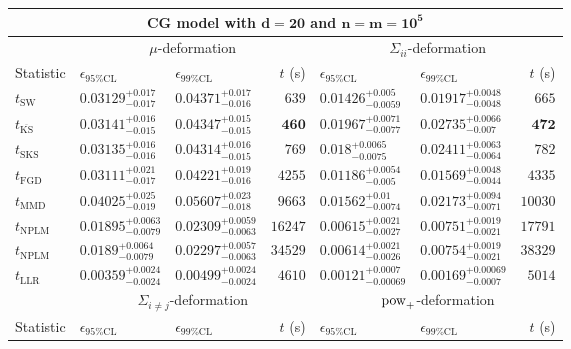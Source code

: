 \begin{tabular}{l|llr|llr}
	\toprule
	\multicolumn{7}{c}{{\bf CG model with $\mathbf{d=20}$ and $\mathbf{n=m=10^{5}}$}} \\
	\toprule
	\multicolumn{1}{c}{} & \multicolumn{3}{c}{$\mu$-deformation} & \multicolumn{3}{c}{$\Sigma_{ii}$-deformation} \\
	Statistic & $\epsilon_{95\%\mathrm{CL}}$ & $\epsilon_{99\%\mathrm{CL}}$ & $t$ (s) & $\epsilon_{95\%\mathrm{CL}}$ & $\epsilon_{99\%\mathrm{CL}}$ & $t$ (s) \\
	\midrule
	$t_{\mathrm{SW}}$ & $0.03129_{-0.017}^{+0.017}$ & $0.04371_{-0.016}^{+0.017}$ & $639$ & $0.01426_{-0.0059}^{+0.005}$ & $0.01917_{-0.0048}^{+0.0048}$ & $665$ \\
	$t_{\overline{\mathrm{KS}}}$ & $0.03141_{-0.015}^{+0.016}$ & $0.04347_{-0.015}^{+0.015}$ & ${\mathbf{460}}$ & $0.01967_{-0.0077}^{+0.0071}$ & $0.02735_{-0.007}^{+0.0066}$ & ${\mathbf{472}}$ \\
	$t_{\mathrm{SKS}}$ & $0.03135_{-0.016}^{+0.016}$ & $0.04314_{-0.015}^{+0.016}$ & $769$ & $0.018_{-0.0075}^{+0.0065}$ & $0.02411_{-0.0064}^{+0.0063}$ & $782$ \\
	$t_{\mathrm{FGD}}$ & ${\mathbf{0.03111_{-0.017}^{+0.021}}}$ & ${\mathbf{0.04221_{-0.016}^{+0.019}}}$ & $4255$ & ${\mathbf{0.01186_{-0.005}^{+0.0054}}}$ & ${\mathbf{0.01569_{-0.0044}^{+0.0048}}}$ & $4335$ \\
	$t_{\mathrm{MMD}}$ & $0.04025_{-0.019}^{+0.025}$ & $0.05607_{-0.018}^{+0.023}$ & $9663$ & $0.01562_{-0.0074}^{+0.01}$ & $0.02173_{-0.0071}^{+0.0094}$ & $10030$ \\
\rowcolor{red!35}	$t_{\mathrm{NPLM}}$ & $0.01895_{-0.0079}^{+0.0063}$ & $0.02309_{-0.0063}^{+0.0059}$ & $16247$ & $0.00615_{-0.0027}^{+0.0021}$ & $0.00751_{-0.0021}^{+0.0019}$ & $17791$ \\
\rowcolor{blue!35}	$t_{\mathrm{NPLM}}$ & $0.0189_{-0.0079}^{+0.0064}$ & $0.02297_{-0.0063}^{+0.0057}$ & $34529$ & $0.00614_{-0.0026}^{+0.0021}$ & $0.00754_{-0.0021}^{+0.0019}$ & $38329$ \\
	$t_{\mathrm{LLR}}$ & $0.00359_{-0.0024}^{+0.0024}$ & $0.00499_{-0.0024}^{+0.0024}$ & $4610$ & $0.00121_{-0.00069}^{+0.0007}$ & $0.00169_{-0.0007}^{+0.00069}$ & $5014$ \\
	\toprule
	\multicolumn{1}{c}{} & \multicolumn{3}{c}{$\Sigma_{i\neq j}$-deformation} & \multicolumn{3}{c}{$\rm{pow}_{+}$-deformation} \\
	Statistic & $\epsilon_{95\%\mathrm{CL}}$ & $\epsilon_{99\%\mathrm{CL}}$ & $t$ (s) & $\epsilon_{95\%\mathrm{CL}}$ & $\epsilon_{99\%\mathrm{CL}}$ & $t$ (s) \\

\end{tabular}

